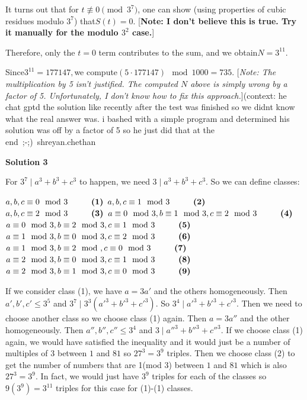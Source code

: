 \begin{enumerate}
 It turns out that for \(t\not\equiv 0\pmod{3^7}\), one can show (using properties of cubic residues modulo \(3^7\)) that$S(t)=0.$ [\textbf{Note: I don't believe this is true.  Try it manually for the modulo $3^2$ case.}]

 Therefore, only the \(t=0\) term contributes to the sum, and we obtain$N=3^{11}.$

 Since$3^{11}=177147,$we compute$(5 \cdot 177147) \mod 1000 = 735.$ [\textit{Note: The multiplication by 5 isn't justified. The computed $N$ above is simply wrong by a factor of 5. Unfortunately, I don't know how to fix this approach.}](context: he chat gptd the solution like recently after the test was finished so we didnt know what the real answer was. i bashed with a simple program and determined his solution was off by a factor of 5 so he just did that at the end ;-;)~shreyan.chethan

 



\textbf{Solution 3}

For $3^{7} \mid a^{3} + b^{3} + c^{3}$ to happen, we need $3 \mid a^{3} + b^{3} + c^{3}$. So we can define classes:

 $a,b,c \equiv 0\mod 3 \hspace{1 cm} \textbf{(1)}$
$a,b,c \equiv 1\mod 3 \hspace{1 cm} \textbf{(2)}$
$a,b,c \equiv 2\mod 3 \hspace{1 cm} \textbf{(3)}$
$a \equiv 0\mod 3, b \equiv 1\mod 3, c \equiv 2\mod 3 \hspace{1 cm} \textbf{(4)}$
$a \equiv 0\mod 3, b \equiv 2\mod 3, c \equiv 1\mod 3 \hspace{1 cm} \textbf{(5)}$
$a \equiv 1\mod 3, b \equiv 0\mod 3, c \equiv 2\mod 3 \hspace{1 cm} \textbf{(6)}$
$a \equiv 1\mod 3, b \equiv 2\mod, c \equiv 0\mod 3 \hspace{1 cm} \textbf{(7)}$
$a \equiv 2\mod 3, b \equiv 0\mod 3, c \equiv 1\mod 3 \hspace{1 cm} \textbf{(8)}$
$a \equiv 2\mod 3, b \equiv 1\mod 3, c \equiv 0\mod 3 \hspace{1 cm} \textbf{(9)}$

 If we consider class (1), we have $a = 3a'$ and the others homogeneously. Then $a', b', c' \leq 3^{5}$ and $3^{7} \mid 3^{3}(a'^{3} + b'^{3} + c'^{3})$. So $3^{4} \mid a'^{3} + b'^{3} + c'^{3}$. Then we need to choose another class so we choose class (1) again. Then $a = 3a''$ and the other homogeneously. Then $a'', b'', c'' \leq 3^{4}$ and $3 \mid a''^{3} + b''^{3} + c''^{3}$. If we choose class (1) again, we would have satisfied the inequality and it would just be a number of multiples of $3$ between $1$ and $81$ so $27^{3} = 3^{9}$ triples. Then we choose class (2) to get the number of numbers that are 1(mod 3) between $1$ and $81$ which is also $27^{3} = 3^{9}$. In fact, we would just have $3^{9}$ triples for each of the classes so $9(3^{9}) = 3^{11}$ triples for this case for (1)-(1) classes. 


\end{enumerate}
